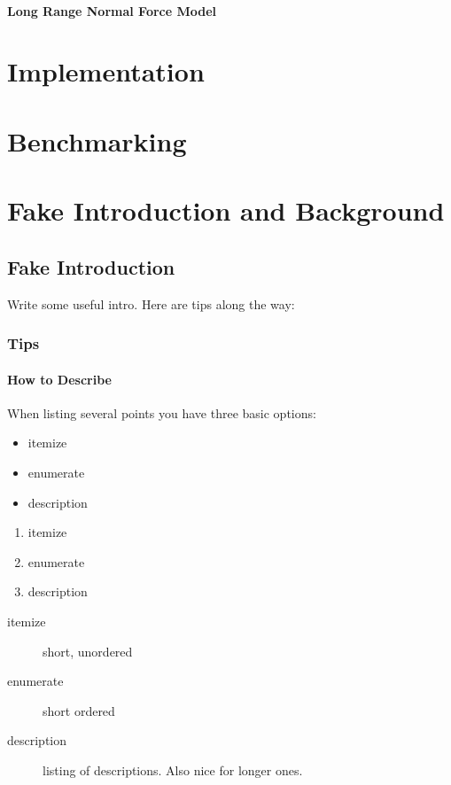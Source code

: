 \documentclass[11pt,
               a4paper,
               bibtotoc,
               idxtotoc,
               headsepline,
               footsepline,
               footexclude,
               BCOR12mm,
               DIV13,
               openany,   %
               ]
               {scrbook}
\begin{document}
\subsection{Long Range Normal Force Model}




\part{Implementation}

\part{Benchmarking}

\part{Fake Introduction and Background}
\chapter{Fake Introduction}
\label{sec:intro}       %
Write some useful intro. Here are tips along the way:

\section{Tips}
\subsection{How to Describe}
\setlength{\columnsep}{30 pt}
When listing several points you have three basic options:
\begin{multicols}{3}
    \begin{itemize}
        \item itemize
        \item enumerate
        \item description
    \end{itemize}

    \vfill\null
    \columnbreak

    \begin{enumerate}
        \item itemize
        \item enumerate
        \item description
    \end{enumerate}

    \vfill\null
    \columnbreak

    \begin{description}
        \item[itemize] short, unordered
        \item[enumerate] short ordered
        \item[description] listing of descriptions. Also nice for longer ones.
    \end{description}

\end{multicols}
\end{document}
